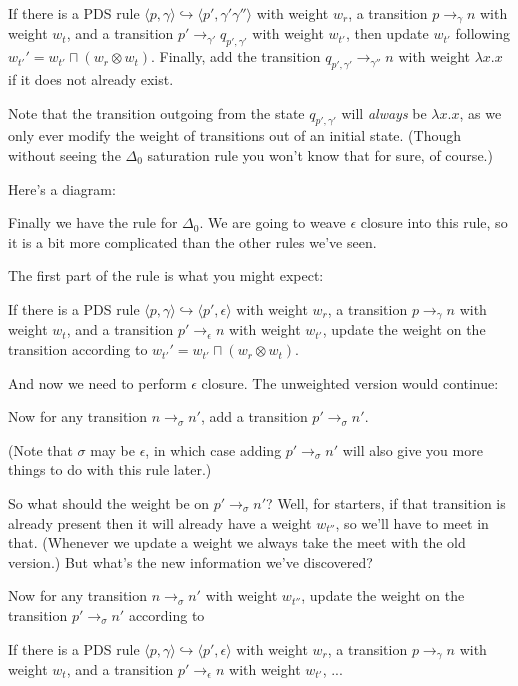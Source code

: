 \documentclass{article}
\newcommand{\Config}[2]{\ensuremath{\langle #1, #2 \rangle}}
\newcommand{\Rule}[2]{\ensuremath{#1 \hookrightarrow #2}}
\newcommand{\Trans}[3]{\ensuremath{#1 \rightarrow_{#2} #3}}
\newcommand{\meet}{\sqcap}
\newcommand{\extend}{\otimes}
\begin{document}
   If there is a PDS rule
   \Rule{\Config{p}{\gamma}}{\Config{p'}{\gamma'\gamma''}} with weight
   $w_r$, a transition \Trans{p}{\gamma}{n} with weight $w_t$, and a
   transition \Trans{p'}{\gamma'}{q_{p',\gamma'}} with weight
   $w_{t'}$, then update $w_{t'}$ following $w_{t'}' = w_{t'} \meet
   (w_r \extend w_t)$. Finally, add the transition
   \Trans{q_{p',\gamma'}}{\gamma''}{n} with weight $\lambda x.x$ if it
   does not already exist.

Note that the transition outgoing from the state $q_{p',\gamma'}$ will
\emph{always} be $\lambda x. x$, as we only ever modify the weight of
transitions out of an initial state. (Though without seeing the
$\Delta_0$ saturation rule you won't know that for sure, of course.)

Here's a diagram:


Finally we have the rule for $\Delta_0$. We are going to weave
$\epsilon$ closure into this rule, so it is a bit more complicated
than the other rules we've seen.

The first part of the rule is what you might expect:

   If there is a PDS rule
   \Rule{\Config{p}{\gamma}}{\Config{p'}{\epsilon}} with weight $w_r$,
   a transition \Trans{p}{\gamma}{n} with weight $w_t$, and a
   transition \Trans{p'}{\epsilon}{n} with weight $w_{t'}$, update the
   weight on the transition according to $w_{t'}' = w_{t'} \meet (w_r
   \extend w_t)$.

And now we need to perform $\epsilon$ closure. The unweighted version
would continue:

   Now for any transition \Trans{n}{\sigma}{n'}, add a transition
   \Trans{p'}{\sigma}{n'}.

(Note that $\sigma$ may be $\epsilon$, in which case adding
\Trans{p'}{\sigma}{n'} will also give you more things to do with
this rule later.)

So what should the weight be on \Trans{p'}{\sigma}{n'}? Well, for
starters, if that transition is already present then it will already
have a weight $w_{t''}$, so we'll have to meet in that. (Whenever we
update a weight we always take the meet with the old version.) But
what's the new information we've discovered?

   Now for any transition \Trans{n}{\sigma}{n'} with weight $w_{t''}$,
   update the weight on the transition \Trans{p'}{\sigma}{n'}
   according to 





   If there is a PDS rule
   \Rule{\Config{p}{\gamma}}{\Config{p'}{\epsilon}} with weight $w_r$,
   a transition \Trans{p}{\gamma}{n} with weight $w_t$, and a
   transition \Trans{p'}{\epsilon}{n} with weight $w_{t'}$, ...
\end{document}
